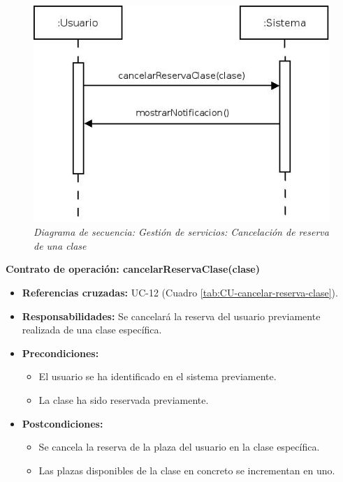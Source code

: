 \begin{figure}
\centering
  \includegraphics[scale=.55]{img/secuencias/gestion-servicios-cancelar-reserva-clase.jpeg}
  \caption{\textit{Diagrama de secuencia: Gestión de servicios: Cancelación de reserva de una clase}}
  \label{fig:secuencia-gestion-servicios-cancelar-reserva-clase}
\end{figure}

\textbf{Contrato de operación: cancelarReservaClase(clase)}
\begin{itemize}
\item \textbf{Referencias cruzadas:} UC-12 (Cuadro \ref{tab:CU-cancelar-reserva-clase}).
\item \textbf{Responsabilidades:} Se cancelará la reserva del usuario previamente realizada de una clase específica.
\item \textbf{Precondiciones:} 
 \begin{itemize}
\item El usuario se ha identificado en el sistema previamente.
\item La clase ha sido reservada previamente.
\end {itemize}
\item \textbf{Postcondiciones:} 
 \begin{itemize}
\item Se cancela la reserva de la plaza del usuario en la clase específica.
\item Las plazas disponibles de la clase en concreto se incrementan en uno.
\end {itemize}
\end {itemize}

